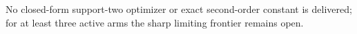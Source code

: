 No closed-form support-two optimizer or exact second-order constant is delivered; for at least three active arms the sharp limiting frontier remains open.